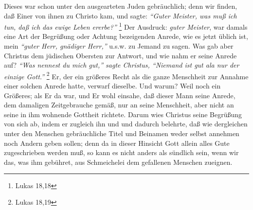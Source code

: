 Dieses war schon unter den ausgearteten Juden gebräuchlich; denn wir finden, daß
Einer von ihnen zu Christo kam, und sagte:
\textit{"`Guter Meister, was muß ich tun,
daß ich das ewige Leben ererbe?"'}
\footnote{Lukas 18,18}
Der Ausdruck: \textit{guter
Meister}, war damals eine Art der Begrüßung oder Achtung bezeigenden Anrede, wie
es jetzt üblich ist, mein \textit{"`guter Herr, gnädiger Herr,"'} u.s.w. zu
Jemand zu
sagen. Was gab aber Christus dem jüdischen Obersten zur Antwort, und wie nahm er
seine Anrede auf?
\textit{"`Was nennest du mich gut,"' sagte Christus, "`Niemand ist gut
ala nur der einzige Gott."'}
\footnote{Lukas 18,19} Er, der ein größeres Recht als
die ganze Menschheit zur Annahme einer solchen Anrede hatte, verwarf dieselbe.
Und warum? Weil noch ein Größeres; als Er da war, und Er wohl einsahe, daß
dieser Mann seine Anrede, dem damaligen Zeitgebrauche gemäß, nur an seine
Menschheit, aber nicht an seine in ihm wohnende Gottheit richtete. Darum wies
Christus seine Begrüßung von sich ab, indem er zugleich ihn und und dadurch
belehrte, daß wie dergleichen unter den Menschen gebräuchliche Titel und
Beinamen weder selbst annehmen noch Andern geben sollen; denn da in dieser
Hinsicht Gott allein alles Gute zugeschrieben werden muß, so kann es nicht
anders als sündlich sein, wenn wir das, was ihm gebühret, aus Schmeichelei dem
gefallenen Menschen zueignen.

\medskip

